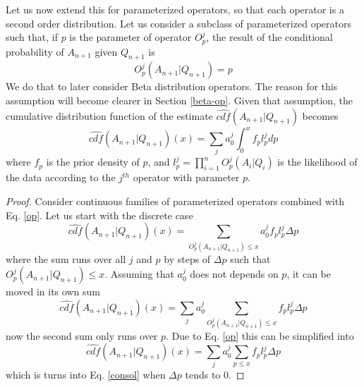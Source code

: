 \documentclass[runningheads]{llncs}
\begin{document}
Let us now extend this for parameterized operators, so that each
operator is a second order distribution. Let us consider a subclass of
parameterized operators such that, if $p$ is the parameter of operator
$O^j_p$, the result of the conditional probability of $A_{n+1}$ given
$Q_{n+1}$ is
\begin{equation}
  \label{op}
O^j_p(A_{n+1}|Q_{n+1})=p
\end{equation}
We do that to later consider Beta distribution operators. The reason
for this assumption will become clearer in Section \ref{beta-op}.
Given that assumption, the cumulative distribution function of the
estimate $\hat{cdf}(A_{n+1}|Q_{n+1})$ becomes
\begin{equation}
  \label{consol}
  \hat{cdf}(A_{n+1}|Q_{n+1})(x) = \sum_j a_0^j \int_0^x f_p l_p^j dp
\end{equation}
where $f_p$ is the prior density of $p$, and
$l_p^j= \prod_{i=1}^{n} O^j_p(A_i|Q_i)$ is the likelihood of the data
according to the $j^{th}$ operator with parameter $p$.
\begin{proof}
  Consider continuous families of parameterized operators combined
  with Eq. \ref{op}. Let us start with the discrete case
\begin{equation}
  \hat{cdf}(A_{n+1}|Q_{n+1})(x) = \sum_{O^j_p(A_{n+1}|Q_{n+1})\le x}
  a_0^j f_p l_p^j \Delta p
\end{equation}
where the sum runs over all $j$ and $p$ by steps of $\Delta p$ such
that $O^j_p(A_{n+1}|Q_{n+1})\le x$. Assuming that $a_0^j$ does not
depends on $p$, it can be moved in its own sum
\begin{equation}
  \hat{cdf}(A_{n+1}|Q_{n+1})(x) = \sum_j a_0^j
  \sum_{O^j_p(A_{n+1}|Q_{n+1})\le x} f_p l_p^j \Delta p
\end{equation}
now the second sum only runs over $p$. Due to Eq. \ref{op} this can be
simplified into
\begin{equation}
  \hat{cdf}(A_{n+1}|Q_{n+1})(x) = \sum_j a_0^j \sum_{p\le x} f_p l_p^j
  \Delta p
\end{equation}
which is turns into Eq. \ref{consol} when $\Delta p$ tends to 0.
\end{proof}
\end{document}
